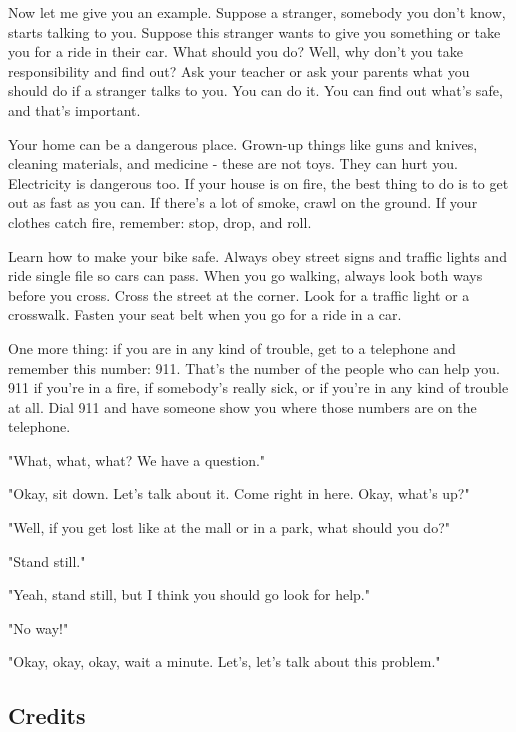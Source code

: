 Now let me give you an example. Suppose a stranger, somebody you don't know, starts talking to you. Suppose this stranger wants to give you something or take you for a ride in their car. What should you do? Well, why don't you take responsibility and find out? Ask your teacher or ask your parents what you should do if a stranger talks to you. You can do it. You can find out what's safe, and that's important.

Your home can be a dangerous place. Grown-up things like guns and knives, cleaning materials, and medicine - these are not toys. They can hurt you. Electricity is dangerous too. If your house is on fire, the best thing to do is to get out as fast as you can. If there's a lot of smoke, crawl on the ground. If your clothes catch fire, remember: stop, drop, and roll.

Learn how to make your bike safe. Always obey street signs and traffic lights and ride single file so cars can pass. When you go walking, always look both ways before you cross. Cross the street at the corner. Look for a traffic light or a crosswalk. Fasten your seat belt when you go for a ride in a car.

One more thing: if you are in any kind of trouble, get to a telephone and remember this number: 911. That's the number of the people who can help you. 911 if you're in a fire, if somebody's really sick, or if you're in any kind of trouble at all. Dial 911 and have someone show you where those numbers are on the telephone.

"What, what, what? We have a question."

"Okay, sit down. Let's talk about it. Come right in here. Okay, what's up?"

"Well, if you get lost like at the mall or in a park, what should you do?"

"Stand still."

"Yeah, stand still, but I think you should go look for help."

"No way!"

"Okay, okay, okay, wait a minute. Let's, let's talk about this problem."

\subsection{Credits}